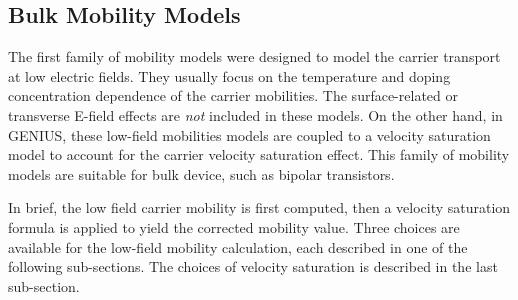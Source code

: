 \documentclass[oneside,12pt]{cgd_book}
\begin{document}
\subsection{Bulk Mobility Models}
The first family of mobility models were designed to model the carrier transport at low electric fields.
        They usually focus on the temperature and doping concentration dependence of the carrier mobilities. The
        surface-related or transverse E-field effects are \emph{not}
included in these models. On the
        other hand, in GENIUS, these low-field mobilities models are coupled to a velocity saturation model to account
        for the carrier velocity saturation effect. This family of mobility models are suitable for bulk device, such as
        bipolar transistors.
\par
In brief, the low field carrier mobility is first computed, then a velocity saturation formula is applied
        to yield the corrected mobility value. Three choices are available for the low-field mobility calculation, each
        described in one of the following sub-sections. The choices of velocity saturation is described in the last
        sub-section.
\par
\end{document}
